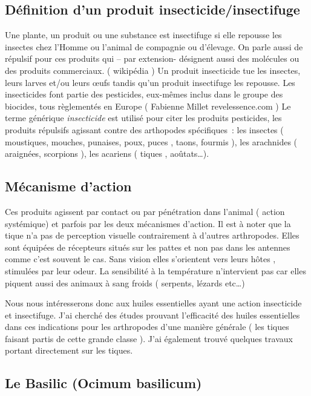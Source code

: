 \documentclass[12pt,a4wide]{article}
\begin{document}
\subsection{Définition d'un produit insecticide/insectifuge}
\label{sec-4-1}
Une plante, un produit ou une substance est insectifuge si elle repousse les insectes chez l'Homme ou l'animal de compagnie ou d'élevage. On parle aussi de répulsif pour ces produits qui – par extension- désignent aussi des molécules ou des produits commerciaux. ( wikipédia )
Un produit insecticide tue les insectes, leurs larves et/ou leurs œufs tandis qu'un produit insectifuge les repousse.
Les insecticides font partie des pesticides, eux-mêmes inclus dans le groupe des biocides, tous règlementés en Europe ( Fabienne Millet revelessence.com )
Le terme générique \emph{insecticide} est utilisé pour citer les produits pesticides, les produits répulsifs agissant contre des arthopodes spécifiques : les insectes ( moustiques, mouches, punaises, poux, puces , taons, fourmis ), les arachnides ( araignées, scorpions ), les acariens ( tiques , aoûtats…).

\subsection{Mécanisme d'action}
\label{sec-4-2}
Ces produits agissent par contact ou par pénétration dans l'animal ( action systémique) et parfois par les deux mécanismes d'action.
Il est à noter que la tique n'a pas de perception visuelle contrairement à d'autres arthropodes. Elles sont équipées de récepteurs situés sur les pattes et non pas dans les antennes comme c'est souvent le cas. Sans vision elles s'orientent vers leurs hôtes , stimulées par leur odeur. La sensibilité à la température n'intervient pas car elles piquent aussi des animaux à sang froids ( serpents, lézards etc\ldots{})



Nous nous intéresserons donc aux huiles essentielles ayant une action insecticide  et insectifuge.
J'ai cherché des études prouvant l'efficacité des huiles essentielles dans ces indications pour les arthropodes d'une manière générale ( les tiques faisant partis de cette grande classe ). J'ai également trouvé quelques travaux portant directement sur les tiques.



\subsection{Le Basilic (Ocimum basilicum)}
\label{sec-4-3}
\end{document}
